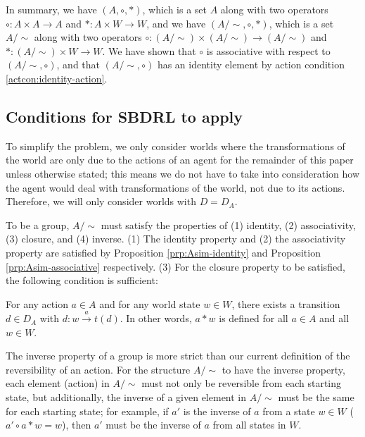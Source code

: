 In summary, we have $(A, \circ, *)$, which is a set $A$ along with two operators $\circ: A \times A \to A$ and $*: A \times W \to W$, and we have $(A/\sim, \circ, *)$, which is a set $A/\sim$ along with two operators $\circ: (A/\sim) \times (A/\sim) \to (A/\sim)$ and $*: (A/\sim) \times W \to W$.
We have shown that $\circ$ is associative with respect to $(A/\sim, \circ)$, and that $(A/\sim, \circ)$ has an identity element by action condition \ref{actcon:identity-action}.


\subsection{Conditions for SBDRL to apply}\label{sec:World conditions}

To simplify the problem, we only consider worlds where the transformations of the world are only due to the actions of an agent for the remainder of this paper unless otherwise stated; this means we do not have to take into consideration how the agent would deal with transformations of the world, not due to its actions.
Therefore, we will only consider worlds with $D = D_{A}$.

To be a group, $A/\sim$ must satisfy the properties of (1) identity, (2) associativity, (3) closure, and (4) inverse.
(1) The identity property and (2) the associativity property are satisfied by Proposition \ref{prp:Asim-identity} and Proposition \ref{prp:Asim-associative} respectively.
(3) For the closure property to be satisfied, the following condition is sufficient:
\begin{world_condition}\label{wldcon:unrestricted-actions}
    For any action $a \in A$ and for any world state $w \in W$, there exists a transition $d \in D_{A}$ with $d: w \xrightarrow{a} t(d)$.
    In other words, $a * w$ is defined for all $a \in A$ and all $w \in W$.

\end{world_condition}

The inverse property of a group is more strict than our current definition of the reversibility of an action.
For the structure $A/\sim$ to have the inverse property, each element (action) in $A/\sim$ must not only be reversible from each starting state, but additionally, the inverse of a given element in $A/\sim$ must be the same for each starting state; for example, if $a'$ is the inverse of $a$ from a state $w \in W$ ($a' \circ a * w = w$), then $a'$ must be the inverse of $a$ from all states in $W$.


